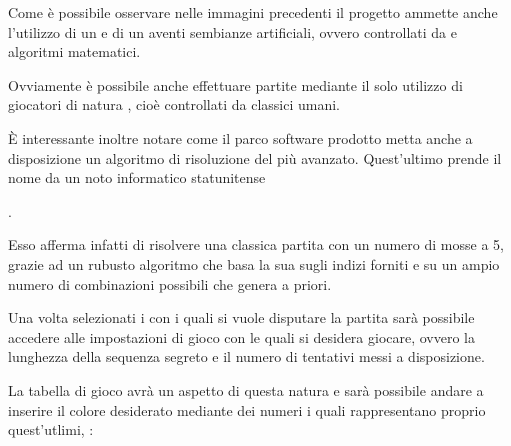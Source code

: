 \documentclass[letterpaper,10pt,italian,openany,oneside]{sphinxmanual}
\begin{document}
Come è possibile osservare nelle immagini precedenti il progetto ammette anche l’utilizzo di un  e di un  aventi sembianze artificiali, ovvero controllati da  e  algoritmi matematici.

Ovviamente è possibile anche effettuare partite mediante il solo utilizzo di giocatori di natura , cioè controllati da classici  umani.

È interessante inoltre notare come il parco software prodotto metta anche a disposizione un algoritmo di risoluzione del  più avanzato. Quest’ultimo prende il nome da un noto informatico statunitense  %
\begin{footnote}[2]\sphinxAtStartFootnote
{}
%
\end{footnote}.

Esso afferma infatti di risolvere una classica partita con un numero di mosse  a 5, grazie ad un rubusto algoritmo che basa la sua  sugli indizi forniti e su un ampio numero di combinazioni possibili che genera a priori.

Una volta selezionati i  con i quali si vuole disputare la partita sarà possibile accedere alle impostazioni di gioco con le quali si desidera giocare, ovvero la lunghezza della sequenza segreto e il numero di tentativi messi a disposizione.


\noindent{}

La tabella di gioco avrà un aspetto di questa natura e sarà possibile andare a inserire il colore desiderato mediante dei numeri i quali rappresentano proprio quest’utlimi, :
\end{document}
